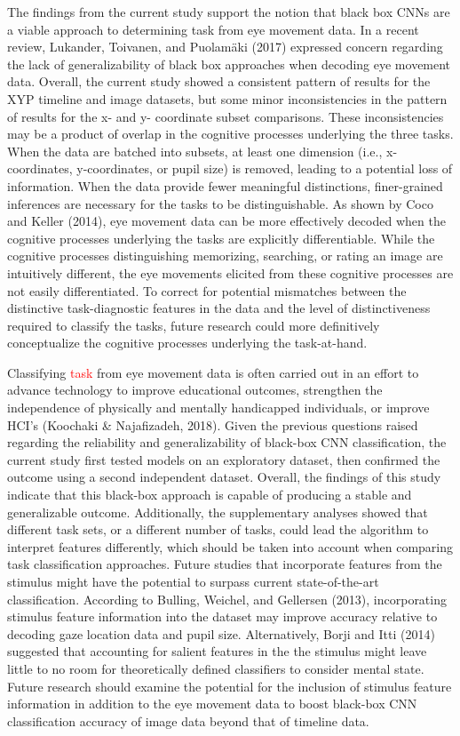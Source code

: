 \documentclass[
  english,
  man, donotrepeattitle,floatsintext]{apa6}
\begin{document}
The findings from the current study support the notion that black box CNNs are a viable approach to determining task from eye movement data. In a recent review, Lukander, Toivanen, and Puolamäki (2017) expressed concern regarding the lack of generalizability of black box approaches when decoding eye movement data. Overall, the current study showed a consistent pattern of results for the XYP timeline and image datasets, but some minor inconsistencies in the pattern of results for the x- and y- coordinate subset comparisons. These inconsistencies may be a product of overlap in the cognitive processes underlying the three tasks. When the data are batched into subsets, at least one dimension (i.e., x-coordinates, y-coordinates, or pupil size) is removed, leading to a potential loss of information. When the data provide fewer meaningful distinctions, finer-grained inferences are necessary for the tasks to be distinguishable. As shown by Coco and Keller (2014), eye movement data can be more effectively decoded when the cognitive processes underlying the tasks are explicitly differentiable. While the cognitive processes distinguishing memorizing, searching, or rating an image are intuitively different, the eye movements elicited from these cognitive processes are not easily differentiated. To correct for potential mismatches between the distinctive task-diagnostic features in the data and the level of distinctiveness required to classify the tasks, future research could more definitively conceptualize the cognitive processes underlying the task-at-hand.

Classifying \textcolor{red}{task} from eye movement data is often carried out in an effort to advance technology to improve educational outcomes, strengthen the independence of physically and mentally handicapped individuals, or improve HCI's (Koochaki \& Najafizadeh, 2018). Given the previous questions raised regarding the reliability and generalizability of black-box CNN classification, the current study first tested models on an exploratory dataset, then confirmed the outcome using a second independent dataset. Overall, the findings of this study indicate that this black-box approach is capable of producing a stable and generalizable outcome. Additionally, the supplementary analyses showed that different task sets, or a different number of tasks, could lead the algorithm to interpret features differently, which should be taken into account when comparing task classification approaches. Future studies that incorporate features from the stimulus might have the potential to surpass current state-of-the-art classification. According to Bulling, Weichel, and Gellersen (2013), incorporating stimulus feature information into the dataset may improve accuracy relative to decoding gaze location data and pupil size. Alternatively, Borji and Itti (2014) suggested that accounting for salient features in the the stimulus might leave little to no room for theoretically defined classifiers to consider mental state. Future research should examine the potential for the inclusion of stimulus feature information in addition to the eye movement data to boost black-box CNN classification accuracy of image data beyond that of timeline data.
\end{document}
